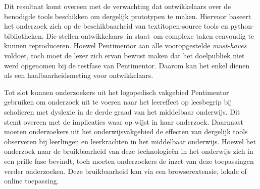 \medspace

Dit resultaat komt overeen met de verwachting dat ontwikkelaars over de benodigde tools beschikken om dergelijk prototypen te maken. Hiervoor baseert het onderzoek zich op de beschikbaarheid van textit{open-source} tools en python-bibliotheken. Die stellen ontwikkelaars in staat om complexe taken eenvoudig te kunnen reproduceren. Hoewel Pentimentor aan alle vooropgestelde \textit{must-haves} voldoet, toch moet de lezer zich ervan bewust maken dat het doelpubliek niet werd opgenomen bij de testfase van Pentimentor. Daarom kan het enkel dienen als een haalbaarheidsmeting voor ontwikkelaars.

\medspace

Tot slot kunnen onderzoekers uit het logopedisch vakgebied Pentimentor gebruiken om onderzoek uit te voeren naar het leereffect op leesbegrip bij scholieren met dyslexie in de derde graad van het middelbaar onderwijs. Dit stemt overeen met de implicaties waar \textcite{Gooding2022} op wijst in haar onderzoek. Daarnaast moeten onderzoekers uit het onderwijsvakgebied de effecten van dergelijk tools observeren bij leerlingen en leerkrachten in het middelbaar onderwijs. Hoewel het onderzoek naar de bruikbaarheid van deze technologieën in het onderwijs zich in een prille fase bevindt, toch moeten onderzoekers de inzet van deze toepassingen verder onderzoeken. Deze bruikbaarheid kan via een browserextensie, lokale of online toepassing.